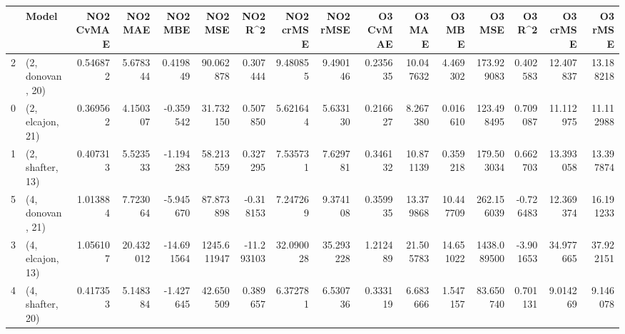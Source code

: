 \begin{tabular}{llrrrrrrrrrrrrrr}
\toprule
{} &             Model &  NO2 CvMAE &    NO2 MAE &    NO2 MBE &      NO2 MSE &    NO2 R\textasciicircum2 &  NO2 crMSE &   NO2 rMSE &  O3 CvMAE &     O3 MAE &     O3 MBE &       O3 MSE &    O3 R\textasciicircum2 &   O3 crMSE &    O3 rMSE \\
\midrule
2 &  (2, donovan, 20) &   0.546872 &   5.678344 &   0.419849 &    90.062878 &   0.307444 &   9.480855 &   9.490146 &  0.235635 &  10.047632 &   4.469302 &   173.929083 &  0.402583 &  12.407837 &  13.188218 \\
0 &  (2, elcajon, 21) &   0.369562 &   4.150307 &  -0.359542 &    31.732150 &   0.507850 &   5.621644 &   5.633130 &  0.216627 &   8.267380 &   0.016610 &   123.498495 &  0.709087 &  11.112975 &  11.112988 \\
1 &  (2, shafter, 13) &   0.407313 &   5.523533 &  -1.194283 &    58.213559 &   0.327295 &   7.535731 &   7.629781 &  0.346132 &  10.871139 &   0.359218 &   179.503034 &  0.662703 &  13.393058 &  13.397874 \\
5 &  (4, donovan, 21) &   1.013884 &   7.723064 &  -5.945670 &    87.873898 &  -0.318153 &   7.247269 &   9.374108 &  0.359935 &  13.379868 &  10.447709 &   262.156039 & -0.726483 &  12.369374 &  16.191233 \\
3 &  (4, elcajon, 13) &   1.056107 &  20.432012 & -14.691564 &  1245.611947 & -11.293103 &  32.090028 &  35.293228 &  1.212489 &  21.505783 &  14.651022 &  1438.089500 & -3.901653 &  34.977665 &  37.922151 \\
4 &  (4, shafter, 20) &   0.417353 &   5.148384 &  -1.427645 &    42.650509 &   0.389657 &   6.372781 &   6.530736 &  0.333119 &   6.683666 &   1.547157 &    83.650740 &  0.701131 &   9.014269 &   9.146078 \\
\bottomrule
\end{tabular}
